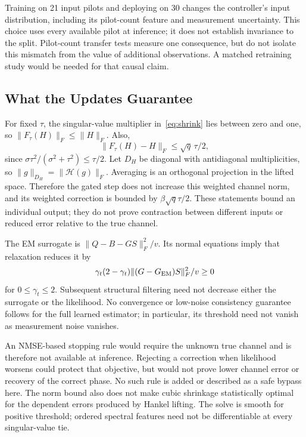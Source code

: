 \documentclass[10pt,journal,letterpaper]{IEEEtran}
\newcommand{\HH}{\mathcal{H}}
\begin{document}
Training on 21 input pilots and deploying on 30 changes the controller's input distribution, including its pilot-count feature and measurement uncertainty. This choice uses every available pilot at inference; it does not establish invariance to the split. Pilot-count transfer tests measure one consequence, but do not isolate this mismatch from the value of additional observations. A matched retraining study would be needed for that causal claim.

\subsection{What the Updates Guarantee}
For fixed $\tau$, the singular-value multiplier in~\eqref{eq:shrink} lies between zero and one, so $\|F_\tau(H)\|_F\le\|H\|_F$. Also,
\begin{equation}
 \|F_\tau(H)-H\|_F\le\sqrt q\,\tau/2,
\end{equation}
since $\sigma\tau^2/(\sigma^2+\tau^2)\le\tau/2$. Let $D_H$ be diagonal with antidiagonal multiplicities, so $\|g\|_{D_H}=\|\HH(g)\|_F$. Averaging is an orthogonal projection in the lifted space. Therefore the gated step does not increase this weighted channel norm, and its weighted correction is bounded by $\beta\sqrt q\tau/2$. These statements bound an individual output; they do not prove contraction between different inputs or reduced error relative to the true channel.

The EM surrogate is $\|Q-B-GS\|_F^2/v$. Its normal equations imply that relaxation reduces it by
\begin{equation}
 \gamma_t(2-\gamma_t)\|(G-G_{\rm EM})S\|_F^2/v\ge0
\end{equation}
for $0\le\gamma_t\le2$. Subsequent structural filtering need not decrease either the surrogate or the likelihood. No convergence or low-noise consistency guarantee follows for the full learned estimator; in particular, its threshold need not vanish as measurement noise vanishes.

An NMSE-based stopping rule would require the unknown true channel and is therefore not available at inference. Rejecting a correction when likelihood worsens could protect that objective, but would not prove lower channel error or recovery of the correct phase. No such rule is added or described as a safe bypass here. The norm bound also does not make cubic shrinkage statistically optimal for the dependent errors produced by Hankel lifting. The solve is smooth for positive threshold; ordered spectral features need not be differentiable at every singular-value tie.
\end{document}
